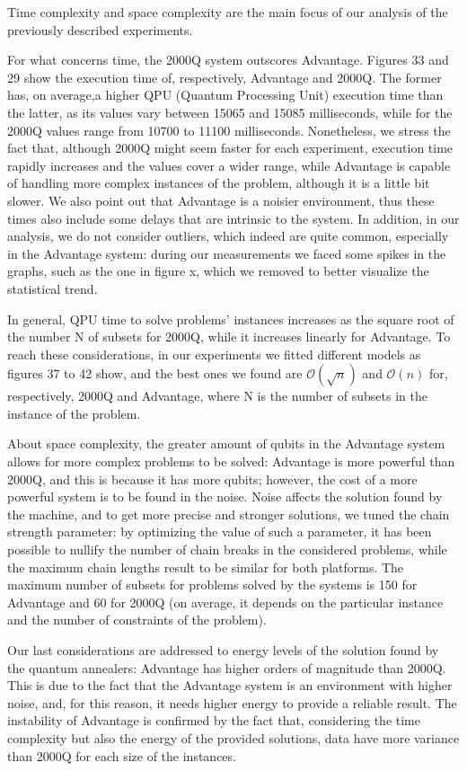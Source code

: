 \documentclass[oneside,a4paper]{article}
\begin{document}
Time complexity and space complexity are the main focus of our analysis of the previously described experiments. 


For what concerns time, the 2000Q system outscores Advantage. Figures 33 and 29 show the execution time of, respectively, Advantage and 2000Q. The former has, on average,a higher QPU (Quantum Processing Unit) execution time than the latter, as its values vary between 15065 and 15085 milliseconds, while for the 2000Q values range from 10700 to 11100 milliseconds. Nonetheless, we stress the fact that, although 2000Q might seem faster for each experiment, execution time rapidly increases and the values cover a wider range, while Advantage is capable of handling more complex instances of the problem, although it is a little bit slower. We also point out that Advantage is a noisier environment, thus these times also include some delays that are intrinsic to the system. In addition, in our analysis, we do not consider outliers, which indeed are quite common, especially in the Advantage system: during our measurements we faced some spikes in the graphs, such as the one in figure x, which we removed to better visualize the statistical trend.

In general, QPU time to solve problems’ instances increases as the square root of the number N of subsets for 2000Q, while it increases linearly for Advantage. To reach these considerations, in our experiments we fitted different models as figures 37 to 42 show, and the best ones we found are
$\mathcal{O}(\sqrt{n})$ and $\mathcal{O}(n)$ for, respectively, 2000Q and Advantage, where N is the number of subsets in the instance of the problem.

About space complexity, the greater amount of qubits in the Advantage system allows for more complex problems to be solved: Advantage is more powerful than 2000Q, and this is because it has more qubits; however, the cost of a more powerful system is to be found in the noise. Noise affects the solution found by the machine, and to get more precise and stronger solutions, we tuned the chain strength parameter: by optimizing the value of such a parameter, it has been possible to nullify the number of chain breaks in the considered problems, while the maximum chain lengths result to be similar for both platforms. The maximum number of subsets for problems solved by the systems is 150 for Advantage and 60 for 2000Q (on average, it depends on the particular instance and the number of constraints of the problem).

Our last considerations are addressed to energy levels of the solution found by the quantum annealers: Advantage has higher orders of magnitude than 2000Q. This is due to the fact that the Advantage system is an environment with higher noise, and, for this reason, it needs higher energy to provide a reliable result. The instability of Advantage is confirmed by the fact that, considering the time complexity but also the energy of the provided solutions, data have more variance than 2000Q for each size of the instances.
\\
\end{document}
